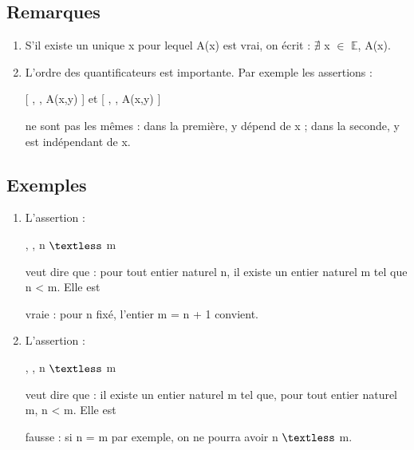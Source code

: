 \documentclass{article}
\begin{document}
	\subsection{Remarques}
	
	
	
	\begin{enumerate}
		
		\item {S’il existe un unique x pour lequel A(x) est vrai, on écrit : $\nexists$ x $\in$ $\mathbb{E}$}, A(x).
		
		\item {L’ordre des quantificateurs est importante. Par exemple les assertions : \newline
			
			\begin{center}
				
				[  , , A(x,y) ] et [  , , A(x,y) ]
				
			\end{center}
			
			ne sont pas les mêmes : dans la première, y dépend de x ; dans la seconde, y est indépendant de x.
			
		}
		
	\end{enumerate}
	
	\subsection{Exemples}
	
	\begin{enumerate}
		
		\item {L’assertion : \\
			
			\begin{center}
				
				, , n $\textless$ m
				
			\end{center}
			
			veut dire que : pour tout entier naturel n, il existe un entier naturel m tel que n < m. Elle est
			
			vraie : pour n fixé, l’entier m = n + 1 convient.
			
		}
		
		\item {L’assertion : \\
			
			\begin{center}
				
				, , n $\textless$ m
				
			\end{center}
			
			veut dire que : il existe un entier naturel m tel que, pour tout entier naturel m, n < m. Elle est
			
			fausse : si n = m par exemple, on ne pourra avoir n $\textless$ m.
			
		}
		
	\end{enumerate}
	
\end{document}
